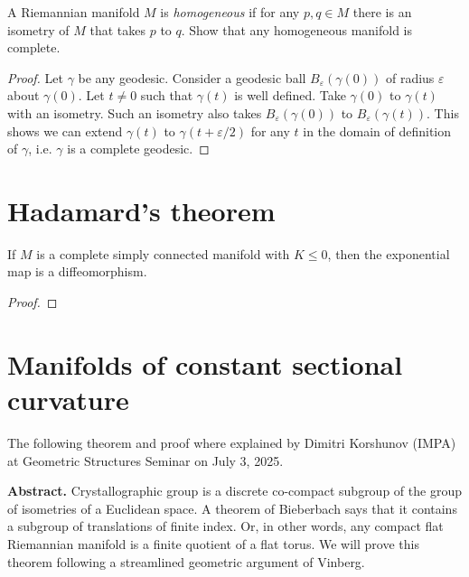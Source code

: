 \documentclass{book}
\begin{document}
\begin{exercise}
\label{exercise-homogeneous-manifold}
A Riemannian manifold $M$ is
{\it homogeneous} if for any $p,q \in M$
there is an isometry of $M$ that takes
$p$ to $q$. Show that any homogeneous
manifold is complete.
\end{exercise}

\begin{proof}
Let $\gamma$ be any geodesic. Consider
a geodesic ball $B_\varepsilon(\gamma(0))$
of radius $\varepsilon$
about $\gamma(0)$. Let $t \neq 0$
such that $\gamma(t)$ is well defined.
Take $\gamma(0)$ to $\gamma(t)$
with an isometry. Such an isometry
also takes $B_\varepsilon(\gamma(0))$
to $B_\varepsilon(\gamma(t))$.
This shows we can extend $\gamma(t)$
to $\gamma(t+\varepsilon/2)$
for any $t$ in the domain of definition
of $\gamma$, i.e. $\gamma$ is a complete
geodesic.
\end{proof}

\section{Hadamard's theorem}
\label{section-Hadamard}

\begin{theorem}[Hadamard]
\label{theorem-Hadamard}
If $M$ is a complete simply connected
manifold with $K\leq 0$, then the
exponential map is a diffeomorphism.
\end{theorem}

\begin{proof}

\end{proof}

\section{Manifolds of constant sectional
curvature}
\label{section-manif-const-secti-curva}

The following theorem and proof where
explained by Dimitri Korshunov (IMPA) at
Geometric Structures Seminar on July 3, 2025.

{\bf Abstract.} Crystallographic group is a
discrete co-compact subgroup of the
group of isometries of a Euclidean space. A
theorem of Bieberbach says that it
contains a subgroup of translations of finite
index. Or, in other words, any
compact flat Riemannian manifold is a finite
quotient of a flat torus. We will
prove this theorem following a streamlined
geometric argument of Vinberg.
\end{document}
